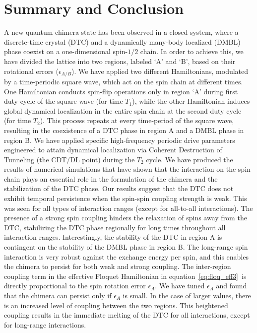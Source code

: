 \documentclass[12pt]{iopart}
\begin{document}
\section{\label{sec:level7} Summary and Conclusion}
A new quantum chimera state has been observed in a closed  system, where a discrete-time crystal (DTC) and a dynamically many-body localized (DMBL) phase coexist on a one-dimensional spin-$1/2$ chain. In order to achieve this, we have divided the lattice into two regions, labeled `A' and `B', based on their rotational errors ($\epsilon_{A/B}$). {We have applied two different Hamiltonians, modulated by a time-periodic square wave, which act on the spin chain at different times. One Hamiltonian conducts spin-flip operations only in region `A' during first duty-cycle of the square wave (for time $T_1$), while the other Hamiltonian induces global dynamical localization in the entire spin chain at the second duty cycle (for time $T_2$). This process repeats at every time-period of the square wave, resulting in the coexistence of a DTC phase in region A and a DMBL phase in region B.} We have applied specific high-frequency periodic drive parameters engineered to attain dynamical localization via Coherent Destruction of Tunneling (the CDT/DL point) during the $T_2$ cycle. We have produced the results of numerical simulations that have shown that the interaction on the spin chain plays an essential role in the formulation of the chimera and the stabilization of the DTC phase. Our results suggest that the DTC does not exhibit temporal persistence when the spin-spin coupling strength is weak. This was seen for all types of interaction ranges (except for all-to-all interactions). The presence of a strong spin coupling hinders the relaxation of spins away from the DTC, stabilizing the DTC phase regionally for long times throughout all interaction ranges. Interestingly, the stability of the DTC in region A is contingent on the stability of the DMBL phase in region B. The long-range spin interaction is very robust against the exchange energy per spin, and this enables the chimera to persist for both weak and strong coupling. 
The inter-region coupling term in the effective Floquet Hamiltonian in equation~\ref{eq:floq_eff3} is directly proportional to the spin rotation error $\epsilon_A$. We have tuned $\epsilon_A$ and found that the chimera can persist only if $\epsilon_A$ is small. In the case of larger values, there is an increased level of coupling between the two regions. This heightened coupling results in the immediate melting of the DTC for all interactions, except for long-range interactions.
	
\end{document}
